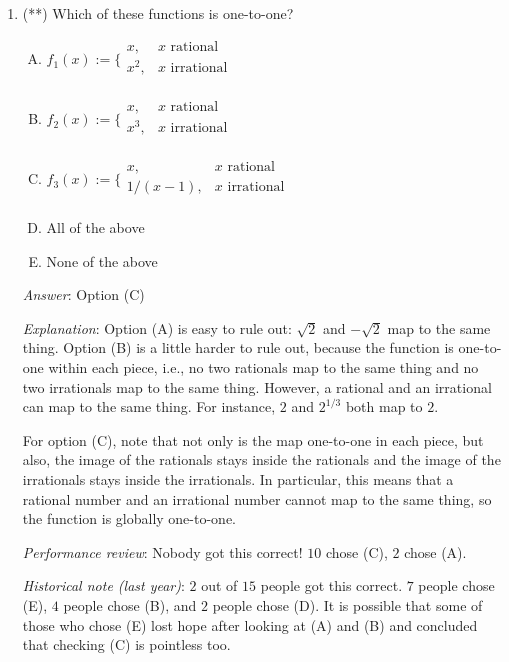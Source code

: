 \documentclass[10pt]{amsart}
\begin{document}
\begin{enumerate}
\item (**) Which of these functions is one-to-one?

  \begin{enumerate}[(A)]
  \item $f_1(x) := \lbrace \begin{array}{rl} x, & x \text{ rational} \\ x^2, & x \text{ irrational}\\\end{array}$ 
  \item $f_2(x) := \lbrace \begin{array}{rl} x, & x \text{ rational} \\ x^3, & x \text{ irrational}\\\end{array}$
  \item $f_3(x) := \lbrace\begin{array}{rl} x, & x \text{ rational} \\ 1/(x - 1), & x \text{ irrational}\\\end{array}$
  \item All of the above
  \item None of the above
  \end{enumerate}

  {\em Answer}: Option (C)

  {\em Explanation}: Option (A) is easy to rule out: $\sqrt{2}$ and
  $-\sqrt{2}$ map to the same thing. Option (B) is a little harder to
  rule out, because the function is one-to-one within each piece,
  i.e., no two rationals map to the same thing and no two irrationals
  map to the same thing. However, a rational and an irrational can map
  to the same thing. For instance, $2$ and $2^{1/3}$ both map to $2$.

  For option (C), note that not only is the map one-to-one in each
  piece, but also, the image of the rationals stays inside the
  rationals and the image of the irrationals stays inside the
  irrationals. In particular, this means that a rational number and an
  irrational number cannot map to the same thing, so the function is
  globally one-to-one.

  {\em Performance review}: Nobody got this correct! $10$ chose (C),
  $2$ chose (A).

  {\em Historical note (last year)}: $2$ out of $15$ people got this
  correct. $7$ people chose (E), $4$ people chose (B), and $2$ people
  chose (D). It is possible that some of those who chose (E) lost hope
  after looking at (A) and (B) and concluded that checking (C) is
  pointless too.


\end{enumerate}
\end{document}
